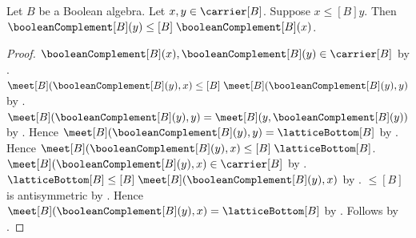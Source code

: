 \begin{theorem}\label{boolean_complement_antitone}
    Let $B$ be a Boolean algebra.
    Let $x,y\in\carrier[B]$.
    Suppose $x\mathrel{\leq[B]}y$.
    Then $\booleanComplement[B](y)
        \mathrel{\leq[B]}\booleanComplement[B](x)$.
\end{theorem}
\begin{proof}
    $\booleanComplement[B](x),\booleanComplement[B](y)
        \in\carrier[B]$ by .
    $\meet[B](\booleanComplement[B](y),x)
        \mathrel{\leq[B]}
        \meet[B](\booleanComplement[B](y),y)$ by
        .
    $\meet[B](\booleanComplement[B](y),y)
        =\meet[B](y,\booleanComplement[B](y))$ by
        .
    Hence $\meet[B](\booleanComplement[B](y),y)
        =\latticeBottom[B]$ by .
    Hence $\meet[B](\booleanComplement[B](y),x)
        \mathrel{\leq[B]}\latticeBottom[B]$.
    $\meet[B](\booleanComplement[B](y),x)\in\carrier[B]$ by
        .
    $\latticeBottom[B]\mathrel{\leq[B]}
        \meet[B](\booleanComplement[B](y),x)$ by
        .
    $\leq[B]$ is antisymmetric by
        .
    Hence $\meet[B](\booleanComplement[B](y),x)
        =\latticeBottom[B]$ by .
    Follows by
        .
\end{proof}

